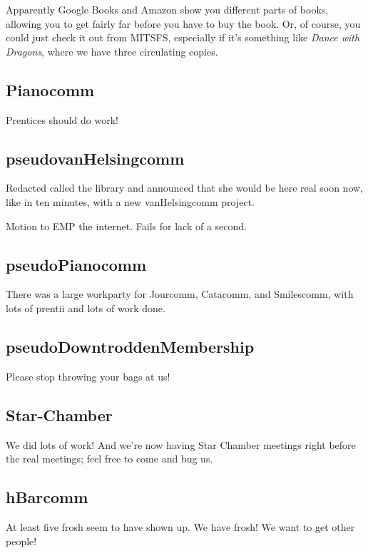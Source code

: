 \documentclass[10pt]{article}
\begin{document}
Apparently Google Books and Amazon show you different parts of books, 
allowing you to get fairly far before you have to buy the book.  Or,
of course, you could just check it out from MITSFS, especially if it's
something like \emph{Dance with Dragons}, where we have three circulating
copies.


\subsection*{Pianocomm}

Prentices should do work!


\subsection*{pseudovanHelsingcomm}

Redacted called the library and announced that she would be here 
real soon now, like in ten minutes, with a new vanHelsingcomm
project.

Motion to EMP the internet.  Fails for lack of a second.


\subsection*{pseudoPianocomm}

There was a large workparty for Jourcomm, Catacomm, and
Smilescomm, with lots of prentii and lots of work done.


\subsection*{pseudoDowntroddenMembership}

Please stop throwing your bags at us!


\subsection*{Star-Chamber}

We did lots of work!  And we're now having Star Chamber meetings
right before the real meetings; feel free to come and bug us.


\subsection*{hBarcomm}

At least five frosh seem to have shown up.  We have frosh!  We want
to get other people!
\end{document}
